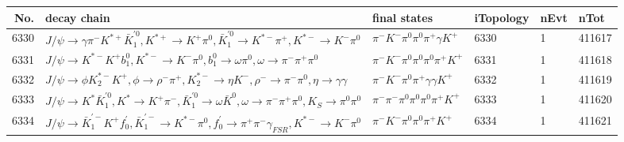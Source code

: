 \begin{table}[htbp] 
\begin{center}
\begin{small}
\begin{tabular}{rlllll}\hline\hline
 No. & decay chain & final states &  iTopology & nEvt & nTot \\\hline
6330&$J/\psi       \rightarrow \gamma       \pi^{-}        K^{*+}         \bar{K}_1^{'0}, K^{*+}          \rightarrow K^{+}          \pi^{0}        , \bar{K}_1^{'0} \rightarrow K^{*-}         \pi^{+}        , K^{*-}          \rightarrow K^{-}          \pi^{0}        $&$\pi^{-}        K^{-}          \pi^{0}        \pi^{0}        \pi^{+}        \gamma       K^{+}          $& 6330&    1&411617\\
6331&$J/\psi       \rightarrow K^{*-}         K^{+}          b_{1}^{0}      , K^{*-}          \rightarrow K^{-}          \pi^{0}        , b_{1}^{0}       \rightarrow \omega         \pi^{0}        , \omega          \rightarrow \pi^{-}        \pi^{+}        \pi^{0}        $&$\pi^{-}        K^{-}          \pi^{0}        \pi^{0}        \pi^{0}        \pi^{+}        K^{+}          $& 6331&    1&411618\\
6332&$J/\psi       \rightarrow \phi           K_2^{*-}       K^{+}          , \phi            \rightarrow \rho^{-}      \pi^{+}        , K_2^{*-}        \rightarrow \eta          K^{-}          , \rho^{-}       \rightarrow \pi^{-}        \pi^{0}        , \eta           \rightarrow \gamma       \gamma       $&$\pi^{-}        K^{-}          \pi^{0}        \pi^{+}        \gamma       \gamma       K^{+}          $& 6332&    1&411619\\
6333&$J/\psi       \rightarrow K^{*}          \bar{K}_1^{'0}, K^{*}           \rightarrow K^{+}          \pi^{-}        , \bar{K}_1^{'0} \rightarrow \omega         \bar{K}^{0}   , \omega          \rightarrow \pi^{-}        \pi^{+}        \pi^{0}        , K_{S}           \rightarrow \pi^{0}        \pi^{0}        $&$\pi^{-}        \pi^{-}        \pi^{0}        \pi^{0}        \pi^{0}        \pi^{+}        K^{+}          $& 6333&    1&411620\\
6334&$J/\psi       \rightarrow \bar{K}_1^{'-}K^{+}          f^{'}_{0}     , \bar{K}_1^{'-} \rightarrow K^{*-}         \pi^{0}        , f^{'}_{0}      \rightarrow \pi^{+}        \pi^{-}        \gamma_{FSR} , K^{*-}          \rightarrow K^{-}          \pi^{0}        $&$\pi^{-}        K^{-}          \pi^{0}        \pi^{0}        \pi^{+}        K^{+}          $& 6334&    1&411621\\

\end{tabular}
\end{small}
\end{center}
\end{table}
